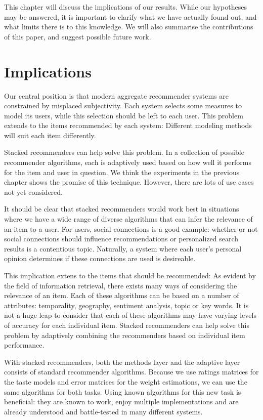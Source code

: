 \label{chap:discussion}

This chapter will discuss the implications of our results.
While our hypotheses may be answered,
it is important to clarify what we have actually found out,
and what limits there is to this knowledge.
We will also summarise the contributions of this paper,
and suggest possible future work.


\section{Implications}      

Our central position is that modern aggregate recommender systems 
are constrained by misplaced subjectivity.
Each system selects some measures to model its users, while this selection should be left to each user.
This problem extends to the items recommended by each system: 
Different modeling methods will suit each item differently.

Stacked recommenders can help solve this problem.
In a collection of possible recommender algorithms, each is adaptively used based 
on how well it performs for the item and user in question.
We think the experiments in the previous chapter shows the promise of this technique.
However, there are lots of use cases not yet considered.

It should be clear that stacked recommenders would work best in situations where
we have a wide range of diverse algorithms that can infer the relevance of an item to a user.
For users, social connections is a good example: whether or not social connections should influence
recommendations or personalized search results is a contentious topic.
Naturally, a system where each user's personal opinion determines if these connections are used is desireable.

This implication extens to the items that should be recommended:
As evident by the field of information retrieval,
there exists many ways of considering the relevance of an item. 
Each of these algorithms can be based on a number of attributes:
temporality, geography, sentiment analysis, topic or key words.
It is not a huge leap to consider that each of these algorithms may have
varying levels of accuracy for each individual item.
Stacked recommenders can help solve this problem by adaptively 
combining the recommenders based on individual item performance.

With stacked recommenders, both the methods layer and the adaptive layer consists of standard recommender algorithms.
Because we use ratings matrices for the taste models and error matrices for the weight estimations,
we can use the same algorithms for both tasks.
Using known algorithms for this new task is beneficial:
they are known to work, enjoy multiple implementations
and are already understood and battle-tested in many different systems.


